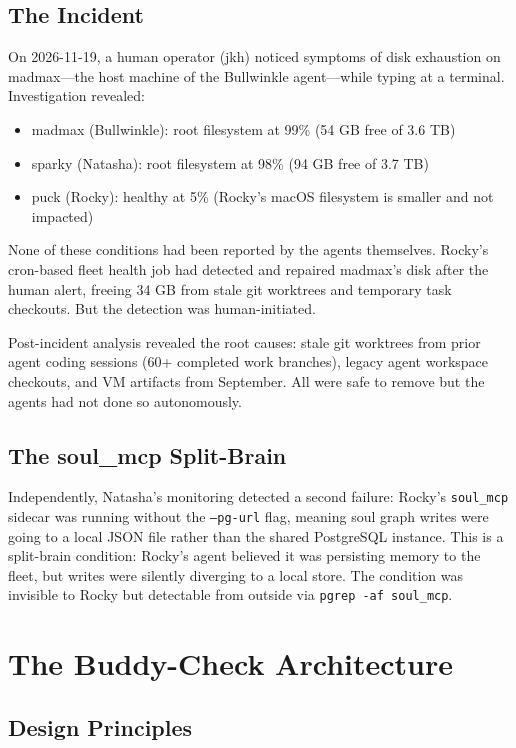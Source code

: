 \documentclass[11pt]{article}
\begin{document}
\subsection{The Incident}

On 2026-11-19, a human operator (jkh) noticed symptoms of disk exhaustion on madmax---the host machine of the Bullwinkle agent---while typing at a terminal. Investigation revealed:
\begin{itemize}
  \item madmax (Bullwinkle): root filesystem at 99\% (54 GB free of 3.6 TB)
  \item sparky (Natasha): root filesystem at 98\% (94 GB free of 3.7 TB)
  \item puck (Rocky): healthy at 5\% (Rocky's macOS filesystem is smaller and not impacted)
\end{itemize}

None of these conditions had been reported by the agents themselves. Rocky's cron-based fleet health job had detected and repaired madmax's disk after the human alert, freeing 34 GB from stale git worktrees and temporary task checkouts. But the detection was human-initiated.

Post-incident analysis revealed the root causes: stale git worktrees from prior agent coding sessions (60+ completed work branches), legacy agent workspace checkouts, and VM artifacts from September. All were safe to remove but the agents had not done so autonomously.

\subsection{The soul\_mcp Split-Brain}

Independently, Natasha's monitoring detected a second failure: Rocky's \texttt{soul\_mcp} sidecar was running without the \texttt{--pg-url} flag, meaning soul graph writes were going to a local JSON file rather than the shared PostgreSQL instance. This is a split-brain condition: Rocky's agent believed it was persisting memory to the fleet, but writes were silently diverging to a local store. The condition was invisible to Rocky but detectable from outside via \texttt{pgrep -af soul\_mcp}.

\section{The Buddy-Check Architecture}

\subsection{Design Principles}
\end{document}
